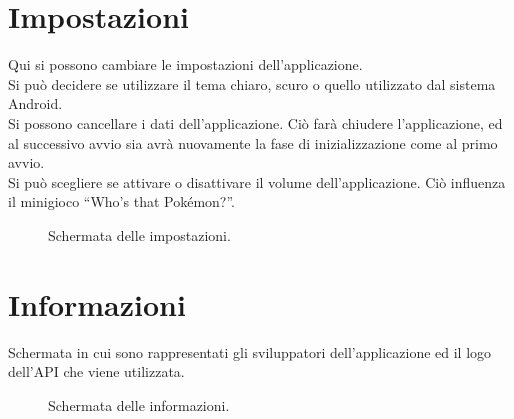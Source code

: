 \documentclass[a4paper,11pt]{article}
\begin{document}
  \section{Impostazioni}
  Qui si possono cambiare le impostazioni dell’applicazione.\\
Si può decidere se utilizzare il tema chiaro, scuro o quello utilizzato dal sistema Android.\\
Si possono cancellare i dati dell’applicazione. Ciò farà chiudere l’applicazione, ed al successivo avvio sia avrà nuovamente la fase di inizializzazione come al primo avvio.\\
Si può scegliere se attivare o disattivare il volume dell’applicazione. Ciò influenza il minigioco “Who’s that Pokémon?”.\\
  \begin{figure}[h!]
    \centering
  \caption{Schermata delle impostazioni.}
\end{figure}
\newpage

\section{Informazioni}
Schermata in cui sono rappresentati gli sviluppatori dell’applicazione ed il logo dell’API che viene utilizzata.
  \begin{figure}[h!]
    \centering
  \caption{Schermata delle informazioni.}
\end{figure}
\end{document}
